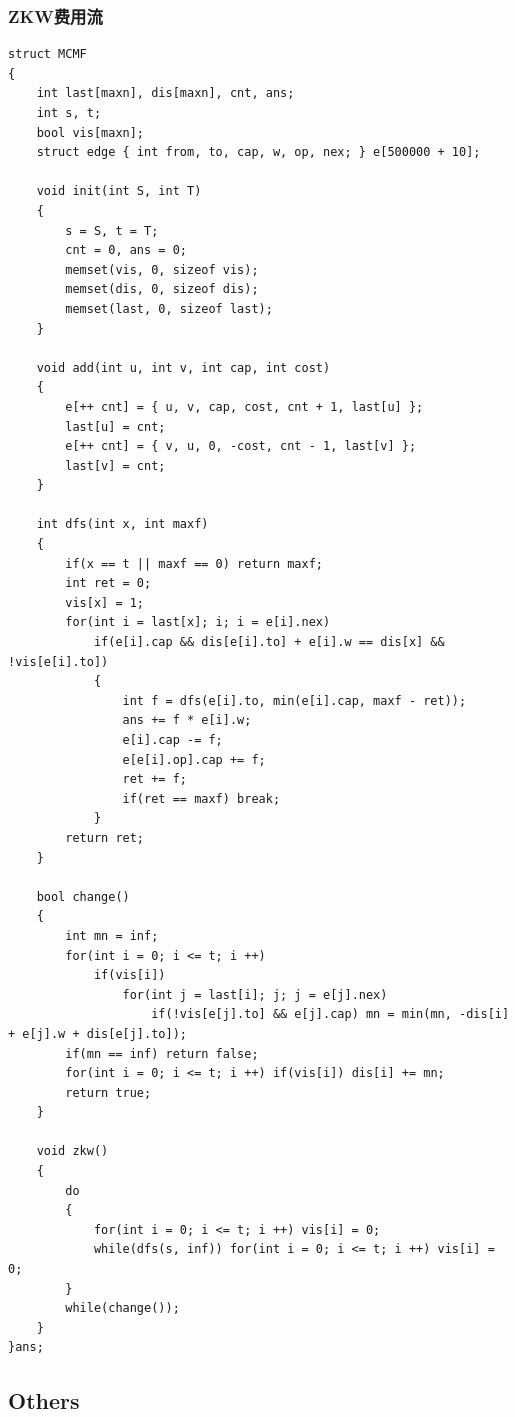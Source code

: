 \documentclass[twoside]{article}
\begin{document}
\subsubsection{ZKW费用流}
\begin{lstlisting}
struct MCMF
{
    int last[maxn], dis[maxn], cnt, ans;
    int s, t;
    bool vis[maxn];
    struct edge { int from, to, cap, w, op, nex; } e[500000 + 10];
 
    void init(int S, int T)
    {
        s = S, t = T;
        cnt = 0, ans = 0;
        memset(vis, 0, sizeof vis);
        memset(dis, 0, sizeof dis);
        memset(last, 0, sizeof last);
    }
 
    void add(int u, int v, int cap, int cost)
    {
        e[++ cnt] = { u, v, cap, cost, cnt + 1, last[u] };
        last[u] = cnt;
        e[++ cnt] = { v, u, 0, -cost, cnt - 1, last[v] };
        last[v] = cnt;
    }
 
    int dfs(int x, int maxf)
    {
        if(x == t || maxf == 0) return maxf;
        int ret = 0;
        vis[x] = 1;
        for(int i = last[x]; i; i = e[i].nex)
            if(e[i].cap && dis[e[i].to] + e[i].w == dis[x] && !vis[e[i].to])
            {
                int f = dfs(e[i].to, min(e[i].cap, maxf - ret));
                ans += f * e[i].w;
                e[i].cap -= f;
                e[e[i].op].cap += f;
                ret += f;
                if(ret == maxf) break;
            }
        return ret;
    }
 
    bool change()
    {
        int mn = inf;
        for(int i = 0; i <= t; i ++)
            if(vis[i])
                for(int j = last[i]; j; j = e[j].nex)
                    if(!vis[e[j].to] && e[j].cap) mn = min(mn, -dis[i] + e[j].w + dis[e[j].to]);
        if(mn == inf) return false;
        for(int i = 0; i <= t; i ++) if(vis[i]) dis[i] += mn;
        return true;
    }
 
    void zkw()
    {
        do
        {
            for(int i = 0; i <= t; i ++) vis[i] = 0;
            while(dfs(s, inf)) for(int i = 0; i <= t; i ++) vis[i] = 0;
        }
        while(change());
    }
}ans;
\end{lstlisting}
\subsection{Others}
\end{document}
